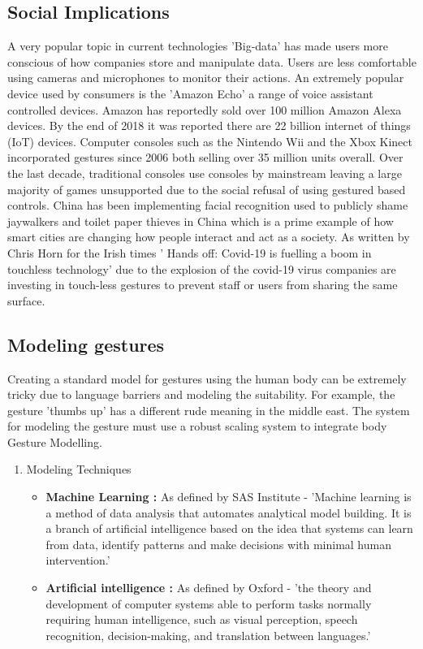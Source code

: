 \subsection{Social Implications }
A very popular topic in current technologies 'Big-data' has made users more conscious of how companies store and manipulate data. Users are less comfortable using cameras and microphones to monitor their actions. An extremely popular device used by consumers is the 'Amazon Echo' a range of voice assistant controlled devices. Amazon has reportedly sold over 100 million Amazon Alexa devices. By the end of 2018 it was reported there are 22 billion internet of things (IoT) devices. Computer consoles such as the  Nintendo Wii and the Xbox Kinect incorporated gestures since 2006 both selling over 35 million units overall. Over the last decade, traditional consoles use consoles by mainstream leaving a large majority of games unsupported due to the social refusal of using gestured based controls. China has been implementing facial recognition used to publicly shame jaywalkers and toilet paper thieves in China which is a prime example of how smart cities are changing how people interact and act as a society. As written by Chris Horn for the Irish times ' Hands off: Covid-19 is fuelling a boom in touchless technology' due to the explosion of the covid-19 virus companies are investing in touch-less gestures to prevent staff or users from sharing the same surface.
  




\subsection{Modeling gestures}
Creating a standard model for gestures using the human body can be extremely tricky due to language barriers and modeling the suitability. For example, the gesture 'thumbs up' has a different rude meaning in the middle east. The system for modeling the gesture must use a robust scaling system to integrate body Gesture Modelling.


\begin{enumerate}
   \item Modeling Techniques 
   \begin{itemize}
     \item \textbf{ Machine Learning :} As defined by SAS Institute - 'Machine learning is a method of data analysis that automates analytical model building. It is a branch of artificial intelligence based on the idea that systems can learn from data, identify patterns and make decisions with minimal human intervention.'
     
       \item \textbf{ Artificial  intelligence :} As defined by Oxford - 'the theory and development of computer systems able to perform tasks normally requiring human intelligence, such as visual perception, speech recognition, decision-making, and translation between languages.'

   \end{itemize}
\end{enumerate}




